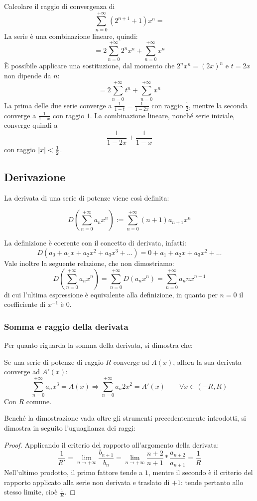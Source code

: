 \begin{examp}
	Calcolare il raggio di convergenza di
	\[
		\sum_{n=0}^{+\infty}(2^{n+1}+1)x^n=
	\]
	La serie è una combinazione lineare, quindi:
	\[
		=2\sum_{n=0}^{+\infty}2^nx^n+\sum_{n=0}^{+\infty}x^n
	\]
	È possibile applicare una sostituzione, dal momento che $2^nx^n=(2x)^n$ e $t=2x$ non dipende da $n$:
	\[
		=2\sum_{n=0}^{+\infty}t^n+\sum_{n=0}^{+\infty}x^n
	\]
	La prima delle due serie converge a $\frac{1}{1-t}=\frac{1}{1-2x}$ con raggio $\frac{1}{2}$, mentre la seconda converge a $\frac{1}{1-x}$ con raggio $1$. La combinazione lineare, nonché serie iniziale, converge quindi a
	\[
		\frac{1}{1-2x}+\frac{1}{1-x}
	\]
	con raggio $\left\lvert x \right\rvert<\frac{1}{2}$.
\end{examp}


\subsection{Derivazione}
La derivata di una serie di potenze viene così definita:
\begin{defin}
	\[
		D\left(\sum_{n=0}^{+\infty} a_nx^n\right):=\sum_{n=0}^{+\infty}(n+1)a_{n+1}x^n
	\]
\end{defin}
La definizione è coerente con il concetto di derivata, infatti:
\[
	D(a_0+a_1x+a_2x^2+a_3x^3+\dots)=0+a_1+a_2x+a_3x^2+\dots
\]
Vale inoltre la seguente relazione, che non dimostriamo:
\[
	D\left(\sum_{n=0}^{+\infty} a_nx^n\right)=\sum_{n=0}^{+\infty}D(a_nx^n)=\sum_{n=0}^{+\infty}a_nnx^{n-1}
\]
di cui l'ultima espressione è equivalente alla definizione, in quanto per $n=0$ il coefficiente di $x^{-1}$ è $0$.

\subsubsection{Somma e raggio della derivata}
Per quanto riguarda la somma della derivata, si dimostra che:
\begin{teor}
	Se una serie di potenze di raggio $R$ converge ad $A(x)$, allora la sua derivata converge ad $A'(x)$:
	\[
		\sum_{n=0}^{+\infty} a_n x^3=A(x)\Rightarrow\sum_{n=0}^{+\infty} a_n 2x^2=A'(x)\qquad\forall x\in(-R,R)
	\]
	Con $R$ comune.
\end{teor}
Benché la dimostrazione vada oltre gli strumenti precedentemente introdotti, si dimostra in seguito l'uguaglianza dei raggi:
\begin{proof}
	Applicando il criterio del rapporto all'argomento della derivata:
	\[
		\frac{1}{R'}=\lim_{n\to+\infty}\frac{b_{n+1}}{b_n}=\lim_{n\to+\infty}\frac{n+2}{n+1}*\frac{a_{n+2}}{a_{n+1}}=\frac{1}{R}
	\]
	Nell'ultimo prodotto, il primo fattore tende a $1$, mentre il secondo è il criterio del rapporto applicato alla serie non derivata e traslato di $+1$: tende pertanto allo stesso limite, cioè $\frac{1}{R}$.
\end{proof}

